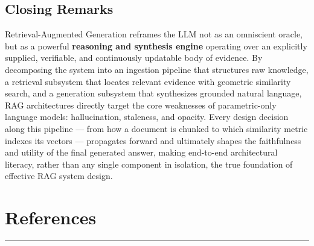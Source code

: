 \documentclass[11pt,a4paper]{article}
\newcommand{\sectionrule}{\vspace{-0.2cm}\noindent\textcolor{ragblue!40}{\rule{\linewidth}{0.6pt}}\vspace{0.3cm}}
\begin{document}
\subsection{Closing Remarks}

Retrieval-Augmented Generation reframes the LLM not as an omniscient oracle, but as a powerful \textbf{reasoning and synthesis engine} operating over an explicitly supplied, verifiable, and continuously updatable body of evidence. By decomposing the system into an ingestion pipeline that structures raw knowledge, a retrieval subsystem that locates relevant evidence with geometric similarity search, and a generation subsystem that synthesizes grounded natural language, RAG architectures directly target the core weaknesses of parametric-only language models: hallucination, staleness, and opacity. Every design decision along this pipeline --- from how a document is chunked to which similarity metric indexes its vectors --- propagates forward and ultimately shapes the faithfulness and utility of the final generated answer, making end-to-end architectural literacy, rather than any single component in isolation, the true foundation of effective RAG system design.

\newpage
\section{References}
\sectionrule

\end{document}
